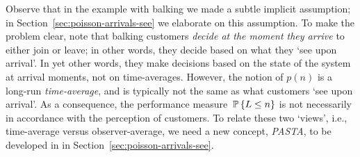 Observe that in the example with balking we made a subtle implicit
assumption; in Section~\ref{sec:poisson-arrivals-see} we elaborate on
this assumption. To make the problem clear, note that balking
customers \emph{decide at the moment they arrive} to either join or
leave; in other words, they decide based on what they `see upon
arrival'. In yet other words, they make decisions based on the state
of the system at arrival moments, not on time-averages. However, the
notion of $p(n)$ is a long-run \emph{time-average}, and is typically
not the same as what customers `see upon arrival'. As a consequence,
the performance measure $\P{L\leq n}$ is not necessarily in accordance
with the perception of customers. To relate these two `views', i.e.,
time-average versus observer-average, we need a new concept,
\emph{PASTA}, to be developed in in Section~\ref{sec:poisson-arrivals-see}.

